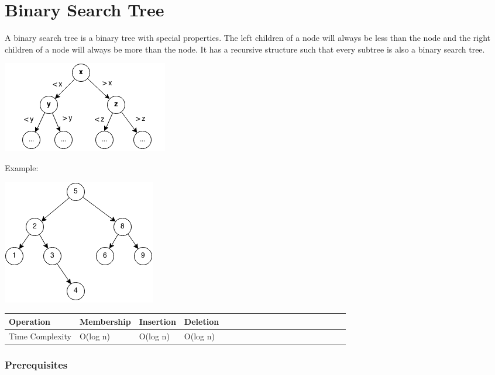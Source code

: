 \documentclass[11pt,oneside]{book}
\makeatletter
\def\maxwidth#1{\ifdim\Gin@nat@width>#1 #1\else\Gin@nat@width\fi}
\makeatother
\begin{document}
        \section{ Binary Search Tree }
        

A binary search tree is a  binary tree with special properties. The left children of a node will always be less than the node and the right children of a node will always be more than the node. It has a recursive structure such that every subtree is also a binary search tree.

\includegraphics[width=\maxwidth{\textwidth}]{bstcompare.png}

Example:

\includegraphics[width=\maxwidth{\textwidth}]{bst.png}

\vspace{10pt} \begin{tabulary}{0.4\linewidth}{|l|l|l|l|l|l|l|l|l|l|l|l|l|l|l|l|l|l|l}\hline


  Operation &
  Membership &
  Insertion &
  Deletion\\
\hline


  Time Complexity &
  O(log n) &
  O(log n) &
  O(log n)\\

\hline\end{tabulary}

\subsubsection{Prerequisites}
\end{document}
